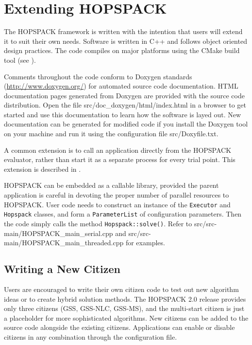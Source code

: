 \clearpage
\section{Extending HOPSPACK}
\label{sec:extend}

The HOPSPACK framework is written with the intention that users will extend it
to suit their own needs.  Software is written in C++ and follows object
oriented design practices.  The code compiles on major platforms using the
CMake build tool (see ).

Comments throughout the code conform
to Doxygen standards (\href{http://www.doxygen.org/}{http://www.doxygen.org/})
for automated source code documentation.  HTML documentation pages generated
from Doxygen are provided with the source code distribution.  Open the file
{\sf src/doc\_doxygen/html/index.html} in a browser to get started and use
this documentation to learn how the software is layed out.
New documentation can be generated for modified code if you install the
Doxygen tool on your machine and run it using the configuration file
{\sf src/Doxyfile.txt}.

A common extension is to call an application directly from the HOPSPACK
evaluator, rather than start it as a separate process for every trial point.
This extension is described in .

HOPSPACK can be embedded as a callable library, provided the parent application
is careful in devoting the proper number of parallel resources to HOPSPACK.
User code needs to construct an instance of the {\tt Executor} and {\tt Hopspack}
classes, and form a {\tt ParameterList} of configuration parameters.
Then the code simply calls the method {\tt Hopspack::solve()}.
Refer to {\sf src/src-main/HOPSPACK\_main\_serial.cpp} and
{\sf src/src-main/HOPSPACK\_main\_threaded.cpp} for examples.


\subsection{Writing a New Citizen}

Users are encouraged to write their own citizen code to test out new
algorithm ideas or to create hybrid solution methods.  The HOPSPACK 2.0
release provides only three citizens (GSS, GSS-NLC, GSS-MS), and the
multi-start citizen is just a placeholder for more sophisticated algorithms.
New citizens can be added to the source code alongside the existing citizens.
Applications can enable or disable citizens in any combination through
the configuration file.

